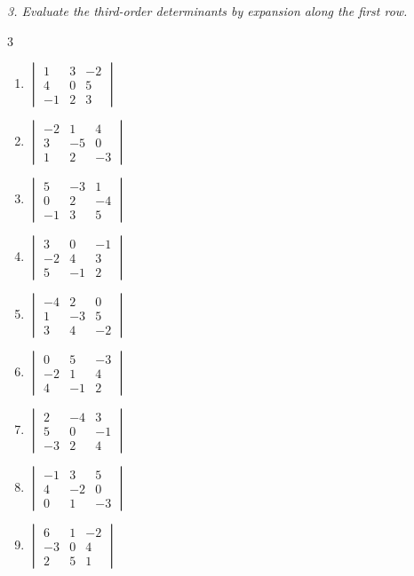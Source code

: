 \emph{3. Evaluate the third-order determinants by expansion along the first row.}
\bigskip
\begin{multicols}{3}\raggedright
\begin{enumerate}[label=\arabic*.,  leftmargin=*]
\item $\begin{vmatrix} 1 & 3 & -2 \\ 4 & 0 & 5 \\ -1 & 2 & 3 \end{vmatrix}$
\item $\begin{vmatrix} -2 & 1 & 4 \\ 3 & -5 & 0 \\ 1 & 2 & -3 \end{vmatrix}$
\item $\begin{vmatrix} 5 & -3 & 1 \\ 0 & 2 & -4 \\ -1 & 3 & 5 \end{vmatrix}$
\item $\begin{vmatrix} 3 & 0 & -1 \\ -2 & 4 & 3 \\ 5 & -1 & 2 \end{vmatrix}$
\item $\begin{vmatrix} -4 & 2 & 0 \\ 1 & -3 & 5 \\ 3 & 4 & -2 \end{vmatrix}$
\item $\begin{vmatrix} 0 & 5 & -3 \\ -2 & 1 & 4 \\ 4 & -1 & 2 \end{vmatrix}$
\item $\begin{vmatrix} 2 & -4 & 3 \\ 5 & 0 & -1 \\ -3 & 2 & 4 \end{vmatrix}$
\item $\begin{vmatrix} -1 & 3 & 5 \\ 4 & -2 & 0 \\ 0 & 1 & -3 \end{vmatrix}$
\item $\begin{vmatrix} 6 & 1 & -2 \\ -3 & 0 & 4 \\ 2 & 5 & 1 \end{vmatrix}$

\end{enumerate}
\end{multicols}
